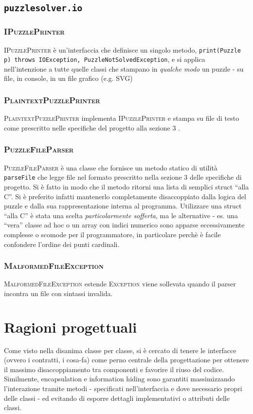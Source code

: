 \documentclass[a4paper]{article}
\newcommand{\Classname}[1]{\textsc{#1}}
\newcommand{\Methodname}[1]{\texttt{#1}}
\newcommand{\Pkgname}[1]{\texttt{#1}}
\begin{document}
\subsection{\Pkgname{puzzlesolver.io}}
\subsubsection{\Classname{IPuzzlePrinter}}
\Classname{IPuzzlePrinter} \`e un'interfaccia che definisce un singolo metodo, \Methodname{print(Puzzle p) throws IOException, PuzzleNotSolvedException}, e si applica nell'intenzione a tutte quelle classi che stampano in \emph{qualche modo} un puzzle - su file, in console, in un file grafico (e.g. SVG) 
\subsubsection{\Classname{PlaintextPuzzlePrinter}}
\Classname{PlaintextPuzzlePrinter} implementa \Classname{IPuzzlePrinter} e stampa su file di testo come prescritto nelle specifiche del progetto alla sezione 3 \cite{prspec}.
\subsubsection{\Classname{PuzzleFileParser}}
\Classname{PuzzleFileParser} \`e una classe che fornisce un metodo statico di utilit\`a \Methodname{parseFile} che legge file nel formato prescritto nella sezione 3 delle specifiche di progetto.
Si \`e fatto in modo che il metodo ritorni una lista di semplici struct ``alla C''.
Si \`e preferito infatti mantenerlo completamente disaccoppiato dalla logica del puzzle e dalla sua rappresentazione interna al programma.
Utilizzare una struct ``alla C'' \`e stata una scelta \emph{particolarmente sofferta}, ma le alternative - es. una ``vera'' classe ad hoc o un array con indici numerico sono apparse eccessivamente complesse o scomode per il programmatore, in particolare perch\`e \`e facile confondere l'ordine dei punti cardinali.

\subsubsection{\Classname{MalformedFileException}}
\Classname{MalformedFileException} estende \Classname{Exception} viene sollevata quando il parser incontra un file con sintassi invalida.
\section{Ragioni progettuali}
Come visto nella disanima classe per classe, si \`e cercato di tenere le interfacce (ovvero i contratti, i cosa-fa) come perno centrale della progettazione per ottenere il massimo disaccoppiamento tra componenti e favorire il riuso del codice.
Similmente, encapsulation e information hiding sono garantiti massimizzando l'interazione tramite metodi - specificati nell'interfaccia e dove necessario propri delle classi - ed evitando di esporre dettagli implementativi o attributi delle classi.
\end{document}
